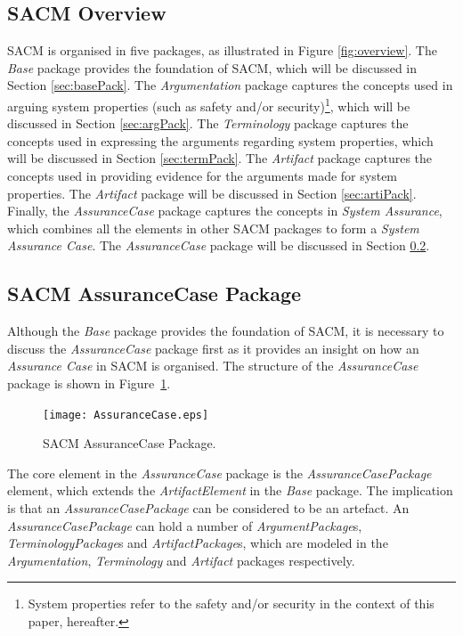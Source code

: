 \subsection{SACM Overview}
SACM is organised in five packages, as illustrated in Figure \ref{fig:overview}. 
The \textit{Base} package provides the foundation of SACM, which will be discussed in Section \ref{sec:basePack}.
The \textit{Argumentation} package captures the concepts used in arguing system properties (such as safety and/or security)\footnote{System properties refer to the safety and/or security in the context of this paper, hereafter.}, which will be discussed in Section \ref{sec:argPack}. 
The \textit{Terminology} package captures the concepts used in expressing the arguments regarding system properties, which will be discussed in Section \ref{sec:termPack}. 
The \textit{Artifact} package captures the concepts used in providing evidence for the arguments made for system properties. 
The \textit{Artifact} package will be discussed in Section \ref{sec:artiPack}. 
Finally, the \textit{AssuranceCase} package captures the concepts in \textit{System Assurance}, which combines all the elements in other SACM packages to form a \textit{System Assurance Case}. 
The \textit{AssuranceCase} package will be discussed in Section \ref{sec:acPack}.

\subsection{SACM AssuranceCase Package}
\label{sec:acPack}
Although the \textit{Base} package provides the foundation of SACM, it is necessary to discuss the \textit{AssuranceCase} package first as it provides an insight on how an \textit{Assurance Case} in SACM is organised. 
The structure of the \textit{AssuranceCase} package is shown in Figure~\ref{fig:ac}.

\begin{figure}
	\centering
	\texttt{[image: AssuranceCase.eps]}
	\caption{SACM AssuranceCase Package.}
	\label{fig:ac}
\end{figure}

The core element in the \textit{AssuranceCase} package is the \textit{AssuranceCasePackage} element, which extends the \textit{ArtifactElement} in the \textit{Base} package. 
The implication is that an \textit{AssuranceCasePackage} can be considered to be an artefact. 
An \textit{AssuranceCasePackage} can hold a number of \textit{ArgumentPackage}s, \textit{TerminologyPackage}s and \textit{ArtifactPackage}s, which are modeled in the \textit{Argumentation}, \textit{Terminology} and \textit{Artifact} packages respectively.

